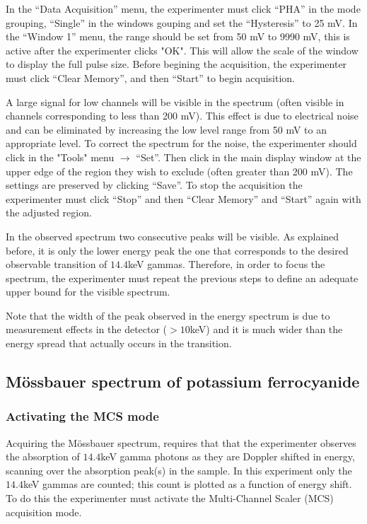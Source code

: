 \documentclass[a4paper, twocolumn]{article}
\begin{document}
In the “Data Acquisition” menu, the experimenter must click “PHA” in the mode grouping, “Single” in the windows gouping and set the “Hysteresis” to 25 mV\cite{0}. 
In the “Window 1” menu, the range should be set from 50 mV to 9990 mV, this is active after the experimenter clicks "OK". This will allow the scale of the window to display the full pulse size\cite{0}. Before begining the acquisition, the experimenter must click “Clear Memory”, and then “Start” to begin acquisition.

A large signal for low channels will be visible in the spectrum (often visible in channels corresponding to less than 200 mV). This effect is due to electrical noise and can be eliminated by increasing the low level range from 50 mV to an appropriate level\cite{0}.
To correct the spectrum for the noise, the experimenter should click in the "Tools" menu $\rightarrow$ “Set”. Then click in the main display window at the upper edge of the region they wish to exclude (often greater than 200 mV). The settings are preserved by clicking “Save”\cite{0}.
To stop the acquisition the experimenter must click “Stop” and then “Clear Memory” and “Start” again with the adjusted region\cite{0}.

In the observed spectrum two consecutive peaks will be visible. As explained before, it is only the lower energy peak the one that corresponds to the desired observable transition of $14.4$keV gammas. Therefore, in order to focus the spectrum, the experimenter must repeat the previous steps to define an adequate upper bound for the visible spectrum. 

Note that the width of the peak observed in the energy spectrum is due to measurement effects in the detector ($>10$keV) and it is much wider than the energy spread that actually occurs in the transition\cite{0}.

\subsection{Mössbauer spectrum of potassium ferrocyanide}
\subsubsection{Activating the MCS mode}
Acquiring the Mössbauer spectrum, requires that that the experimenter observes the absorption of $14.4$keV gamma photons as they are Doppler shifted in energy, scanning over the absorption peak(s) in the sample\cite{0}.
In this experiment only the $14.4$keV gammas are counted; this count is plotted as a function of energy shift. To do this the experimenter must activate the Multi-Channel Scaler (MCS) acquisition mode.
\end{document}
